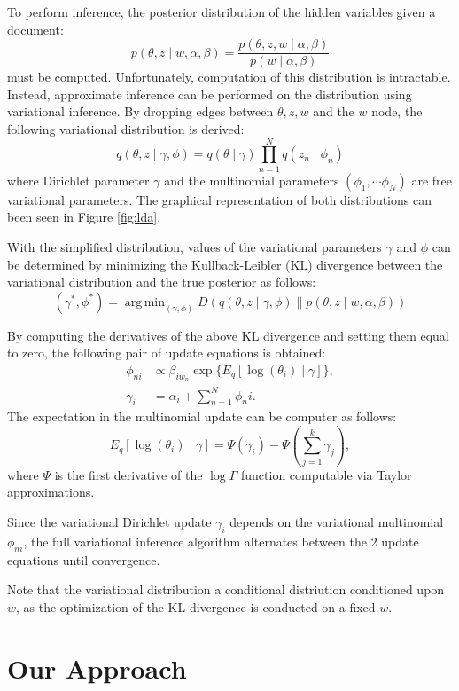 \documentclass[a4paper]{article}
\DeclareMathOperator*{\argmin}{arg\,min}
\begin{document}
	To perform inference, the posterior distribution of the hidden variables given a document:
	$$p(\theta,z \mid w,\alpha,\beta) = \frac{p(\theta,z,w\mid \alpha,\beta)}{p(w\mid \alpha,\beta)}$$
	must be computed. Unfortunately, computation of this distribution is intractable.
	Instead, approximate inference can be performed on the distribution using variational inference.
	By dropping edges between $\theta, z, w$ and the $w$ node, the following variational distribution is derived:
	$$q(\theta,z \mid \gamma,\phi) = q(\theta\mid\gamma) \prod_{n=1}^{N} q(z_n\mid\phi_n)$$
	where Dirichlet parameter $\gamma$ and the multinomial parameters $(\phi_1,\cdots \phi_N)$ are free variational parameters.
	The graphical representation of both distributions can been seen in Figure \ref{fig:lda}.

	With the simplified distribution, values of the variational parameters $\gamma$ and $\phi$ can be determined
	by minimizing the Kullback-Leibler (KL) divergence between the variational distribution and the true posterior as follows:
	$$(\gamma^*,\phi^*) = \argmin_{(\gamma,\phi)} D(q(\theta,z \mid \gamma, \phi) \parallel p(\theta,z \mid w,\alpha,\beta))$$
	
	By computing the derivatives of the above KL divergence and setting them equal to zero, the following pair of update equations is obtained:
	\begin{align*}
		\phi_{ni} &\propto \beta_{iw_n} \exp{\{E_q[\log{(\theta_i)}  \mid \gamma]\}}, \\
		\gamma_i &= \alpha_i + \textstyle \sum_{n=1}^N \phi_ni.
	\end{align*}
	The expectation in the multinomial update can be computer as follows:
	$$E_q[\log{(\theta_i)}  \mid \gamma] = \Psi(\gamma_i)-\Psi(\textstyle \sum_{j=1}^k \gamma_j),$$
	where $\Psi$ is the first derivative of the $\log\Gamma$ function computable via Taylor approximations.
	
	Since the variational Dirichlet update $\gamma_i$ depends on the variational multinomial $\phi_{ni}$,
	the full variational inference algorithm alternates between the 2 update equations until convergence.

	Note that the variational distribution a conditional distriution conditioned upon $w$,
	as the optimization of the KL divergence is conducted on a fixed $w$.
	\section{Our Approach}
		
\end{document}
